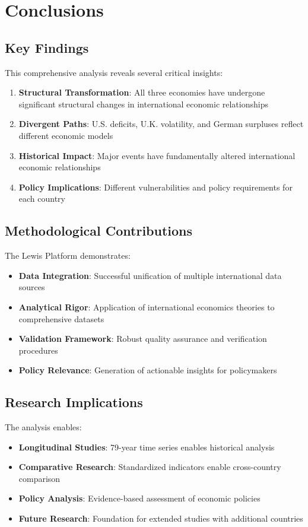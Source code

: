 \documentclass[11pt,a4paper]{article}
\begin{document}
\section{Conclusions}

\subsection{Key Findings}
This comprehensive analysis reveals several critical insights:

\begin{enumerate}
    \item \textbf{Structural Transformation}: All three economies have undergone significant structural changes in international economic relationships
    \item \textbf{Divergent Paths}: U.S. deficits, U.K. volatility, and German surpluses reflect different economic models
    \item \textbf{Historical Impact}: Major events have fundamentally altered international economic relationships
    \item \textbf{Policy Implications}: Different vulnerabilities and policy requirements for each country
\end{enumerate}

\subsection{Methodological Contributions}
The Lewis Platform demonstrates:

\begin{itemize}
    \item \textbf{Data Integration}: Successful unification of multiple international data sources
    \item \textbf{Analytical Rigor}: Application of international economics theories to comprehensive datasets
    \item \textbf{Validation Framework}: Robust quality assurance and verification procedures
    \item \textbf{Policy Relevance}: Generation of actionable insights for policymakers
\end{itemize}

\subsection{Research Implications}
The analysis enables:

\begin{itemize}
    \item \textbf{Longitudinal Studies}: 79-year time series enables historical analysis
    \item \textbf{Comparative Research}: Standardized indicators enable cross-country comparison
    \item \textbf{Policy Analysis}: Evidence-based assessment of economic policies
    \item \textbf{Future Research}: Foundation for extended studies with additional countries
\end{itemize}
\end{document}
